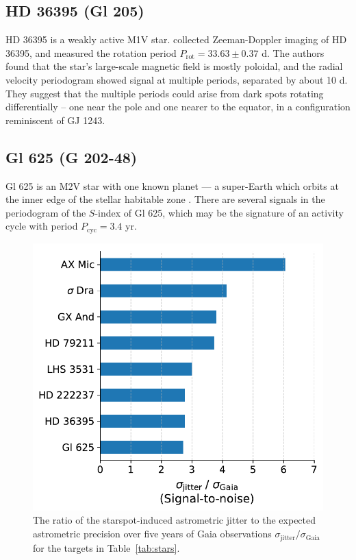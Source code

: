 \subsection{HD 36395 (Gl 205)}

HD 36395 is a weakly active M1V star. \citet{Hebrard2016} collected Zeeman-Doppler imaging of HD 36395, and measured the rotation period $P_{\mathrm{rot}} = 33.63 \pm 0.37$ d. The authors found that the star's large-scale magnetic field is mostly poloidal, and the radial velocity periodogram showed signal at multiple periods, separated by about 10 d. They suggest that the multiple periods could arise from dark spots rotating differentially -- one near the pole and one nearer to the equator, in a configuration reminiscent of GJ 1243. 

\subsection{Gl 625 (G 202-48)}

Gl 625 is an M2V star with one known planet --- a super-Earth which orbits at the inner edge of the stellar habitable zone \citep{Mascareno2017}. There are several signals in the periodogram of the $S$-index of Gl 625, which may be the signature of an activity cycle with period $P_{\mathrm{cyc}} = 3.4$ yr. 

\begin{figure}
\centering
\includegraphics[scale=0.6]{gaia/best_targets.pdf}
\caption{The ratio of the starspot-induced astrometric jitter to the expected astrometric precision over five years of Gaia observations $\sigma_{\mathrm{jitter}}/\sigma_{\mathrm{Gaia}}$ for the targets in Table~\ref{tab:stars}. \label{fig:best}}
\end{figure}

